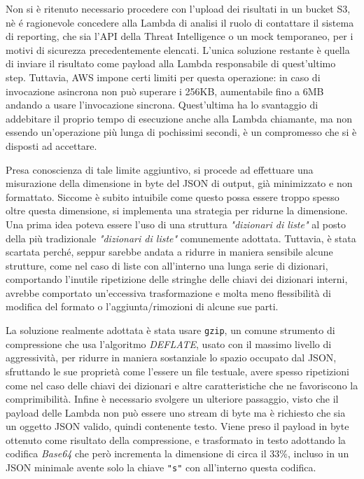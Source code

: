 Non si è ritenuto necessario procedere con l'upload dei risultati in un bucket S3, nè é ragionevole concedere alla Lambda di analisi il ruolo di contattare il sistema di reporting, che sia l'API della Threat Intelligence o un mock temporaneo, per i motivi di sicurezza precedentemente elencati. L'unica soluzione restante è quella di inviare il risultato come payload alla Lambda responsabile di quest'ultimo step. Tuttavia, AWS impone certi limiti per questa operazione: in caso di invocazione asincrona non può superare i 256KB, aumentabile fino a 6MB andando a usare l'invocazione sincrona. Quest'ultima ha lo svantaggio di addebitare il proprio tempo di esecuzione anche alla Lambda chiamante, ma non essendo un'operazione più lunga di pochissimi secondi, è un compromesso che si è disposti ad accettare.

Presa conoscienza di tale limite aggiuntivo, si procede ad effettuare una misurazione della dimensione in byte del JSON di output, già minimizzato e non formattato. Siccome è subito intuibile come questo possa essere troppo spesso oltre questa dimensione, si implementa una strategia per ridurne la dimensione.
Una prima idea poteva essere l'uso di una struttura \emph{"dizionari di liste"} al posto della più tradizionale \emph{"dizionari di liste"} comunemente adottata. Tuttavia, è stata scartata perché, seppur sarebbe andata a ridurre in maniera sensibile alcune strutture, come nel caso di liste con all'interno una lunga serie di dizionari, comportando l'inutile ripetizione delle stringhe delle chiavi dei dizionari interni, avrebbe comportato un'eccessiva trasformazione e molta meno flessibilità di modifica del formato o l'aggiunta/rimozioni di alcune sue parti.

La soluzione realmente adottata è stata usare \texttt{gzip}, un comune strumento di compressione che usa l'algoritmo \emph{DEFLATE}, usato con il massimo livello di aggressività,
per ridurre in maniera sostanziale lo spazio occupato dal JSON,
sfruttando le sue proprietà come l'essere un file testuale, avere spesso ripetizioni come nel caso delle chiavi dei dizionari e altre caratteristiche che ne favoriscono la comprimibilità.
Infine è necessario svolgere un ulteriore passaggio, visto che il payload delle Lambda non può essere uno stream di byte ma è richiesto che sia un oggetto JSON valido, quindi contenente testo. 
Viene preso il payload in byte ottenuto come risultato della compressione, e trasformato in testo adottando la codifica \emph{Base64} che però incrementa la dimensione di circa il 33\%, incluso in un JSON minimale avente solo la chiave \texttt{"s"} con all'interno questa codifica.

